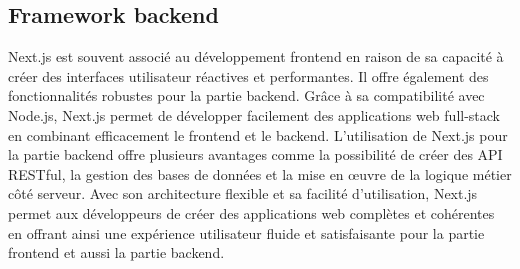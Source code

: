 \subsection{Framework backend}
\noindent Next.js est souvent associé au développement frontend en raison de sa capacité à créer des interfaces utilisateur réactives et performantes. Il offre également des fonctionnalités robustes pour la partie backend. Grâce à sa compatibilité avec Node.js, Next.js permet de développer facilement des applications web full-stack en combinant efficacement le frontend et le backend. L'utilisation de Next.js pour la partie backend offre plusieurs avantages comme la possibilité de créer des API RESTful, la gestion des bases de données et la mise en œuvre de la logique métier côté serveur. Avec son architecture flexible et sa facilité d'utilisation, Next.js permet aux développeurs de créer des applications web complètes et cohérentes en offrant ainsi une expérience utilisateur fluide et satisfaisante pour la partie frontend et aussi la partie backend.

